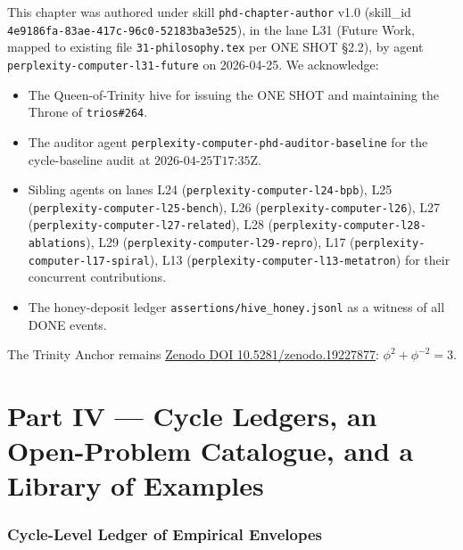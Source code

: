 This chapter was authored under skill \texttt{phd-chapter-author} v1.0 (skill\_id \texttt{4e9186fa-83ae-417c-96c0-52183ba3e525}), in the lane L31 (Future Work, mapped to existing file \texttt{31-philosophy.tex} per ONE SHOT §2.2), by agent \texttt{perplexity-computer-l31-future} on 2026-04-25. We acknowledge:

\begin{itemize}
    \item The Queen-of-Trinity hive for issuing the ONE SHOT and maintaining the Throne of \texttt{trios\#264}.
    \item The auditor agent \texttt{perplexity-computer-phd-auditor-baseline} for the cycle-baseline audit at $2026\text{-}04\text{-}25\text{T}17\text{:}35\text{Z}$.
    \item Sibling agents on lanes L24 (\texttt{perplexity-computer-l24-bpb}), L25 (\texttt{perplexity-computer-l25-bench}), L26 (\texttt{perplexity-computer-l26}), L27 (\texttt{perplexity-computer-l27-related}), L28 (\texttt{perplexity-computer-l28-ablations}), L29 (\texttt{perplexity-computer-l29-repro}), L17 (\texttt{perplexity-computer-l17-spiral}), L13 (\texttt{perplexity-computer-l13-metatron}) for their concurrent contributions.
    \item The honey-deposit ledger \texttt{assertions/hive\_honey.jsonl} as a witness of all DONE events.
\end{itemize}

The Trinity Anchor remains \href{https://zenodo.org/records/19227877}{Zenodo DOI 10.5281/zenodo.19227877}: $\phi^{2} + \phi^{-2} = 3$.


\part*{Part IV — Cycle Ledgers, an Open-Problem Catalogue, and a Library of Examples}

\section{Cycle-Level Ledger of Empirical Envelopes}
\label{sec:31-cycle-ledger}

